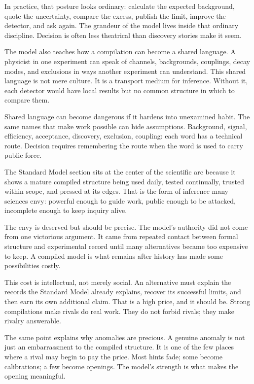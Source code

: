 In practice, that posture looks ordinary: calculate the expected background,
quote the uncertainty, compare the excess, publish the limit, improve the
detector, and ask again. The grandeur of the model lives inside that
ordinary discipline. Decision is often less theatrical than discovery stories
make it seem.

The model also teaches how a compilation can become a shared language. A
physicist in one experiment can speak of channels, backgrounds, couplings,
decay modes, and exclusions in ways another experiment can understand. This
shared language is not mere culture. It is a transport medium for inference.
Without it, each detector would have local results but no common structure in
which to compare them.

Shared language can become dangerous if it hardens into unexamined habit.
The same names that make work possible can hide assumptions. Background,
signal, efficiency, acceptance, discovery, exclusion, coupling: each word has
a technical route. Decision requires remembering the route when the word is
used to carry public force.

The Standard Model section sits at the center of the scientific arc because it
shows a mature compiled structure being used daily, tested
continually, trusted within scope, and pressed at its edges. That is the form
of inference many sciences envy: powerful enough to guide work, public enough
to be attacked, incomplete enough to keep inquiry alive.

The envy is deserved but should be precise. The model's authority did not
come from one victorious argument. It came from repeated contact between
formal structure and experimental record until many alternatives became too
expensive to keep. A compiled model is what remains after history has made
some possibilities costly.

This cost is intellectual, not merely social. An alternative must explain the
records the Standard Model already explains, recover its successful limits,
and then earn its own additional claim. That is a high price, and it should
be. Strong compilations make rivals do real work. They do not forbid rivals;
they make rivalry answerable.

The same point explains why anomalies are precious. A genuine anomaly is not
just an embarrassment to the compiled structure. It is one of the few places
where a rival may begin to pay the price. Most hints fade; some become
calibrations; a few become openings. The model's strength is what makes the
opening meaningful.

